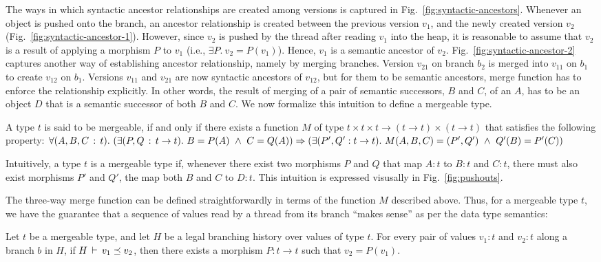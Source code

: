 The ways in which syntactic ancestor relationships are created among
versions is captured in Fig.~\ref{fig:syntactic-ancestors}. Whenever an
object is pushed onto the branch, an ancestor relationship is created
between the previous version $v_1$, and the newly created version
$v_2$ (Fig.~\ref{fig:syntactic-ancestor-1}). However, since $v_2$ is
pushed by the thread after reading $v_1$ into the heap, it is
reasonable to assume that $v_2$ is a result of applying a morphism $P$
to $v_1$ (i.e., $\exists P.~v_2 = P(v_1)$).  Hence, $v_1$ is a
semantic ancestor of $v_2$.  Fig.~\ref{fig:syntactic-ancestor-2}
captures another way of establishing ancestor relationship, namely by
merging branches. Version $v_{21}$ on branch $b_2$ is merged into
$v_{11}$ on $b_1$ to create $v_{12}$ on $b_1$. Versions $v_{11}$ and
$v_{21}$ are now syntactic ancestors of $v_{12}$, but for them to be
semantic ancestors, merge function has to enforce the relationship
explicitly. In other words, the result of merging of a pair of
semantic successors, $B$ and $C$, of an $A$, has to be an object $D$
that is a semantic successor of both $B$ and $C$. We now formalize
this intuition to define a mergeable type.
\begin{definition} 
A type $t$ is said to be mergeable, if and only if there exists a
function $M$ of type $t \times t \times t \rightarrow (t \rightarrow
t)\times(t \rightarrow t)$ that satisfies the following property:
$\forall (A, B, C\,:\,t).~ (\exists (P,Q\,:\, t \rightarrow t).~ B =
P(A) ~\wedge~ C = Q(A)) \Rightarrow (\exists (P',Q': t\rightarrow
t).~M(A,B,C) = (P',Q') ~\wedge~  Q'(B) = P'(C))$
\end{definition}
Intuitively, a type $t$ is a mergeable type if, whenever there exist
two morphisms $P$ and $Q$ that map $A:t$ to $B:t$ and $C:t$, there
must also exist morphisms $P'$ and $Q'$, the map both $B$ and $C$ to
$D:t$. This intuition is expressed visusally in
Fig.~\ref{fig:pushouts}.

The three-way merge function  can be defined
straightforwardly in terms of the function $M$ described above. Thus,
for a mergeable type $t$, we have the guarantee that a sequence of
values read by a thread from its branch ``makes sense'' as per the
data type semantics: 

\begin{theorem} 
Let $t$ be a mergeable type, and let $H$ be a legal branching history
over values of type $t$. For every pair of values $v_1:t$ and $v_2:t$
along a branch $b$ in $H$, if $H\,\vdash\,v_1 \preceq v_2$, then there
exists a morphism $P:t\rightarrow t$ such that $v_2 = P(v_1)$.
\end{theorem}

